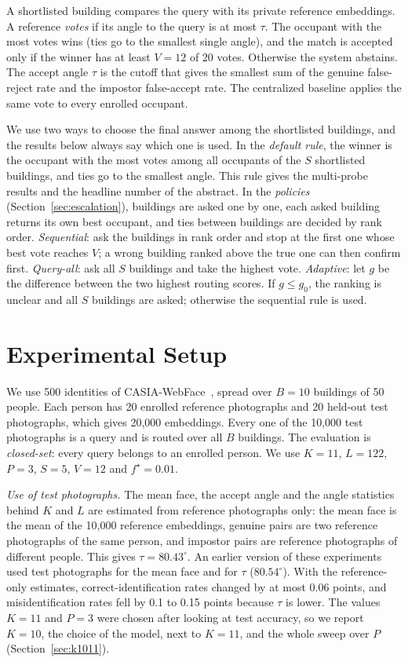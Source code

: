 \documentclass[runningheads]{llncs}
\begin{document}
A shortlisted building compares the query with its private reference embeddings. A reference \emph{votes} if its
angle to the query is at most $\tau$. The occupant with the most votes wins (ties go to the smallest single angle),
and the match is accepted only if the winner has at least $V=12$ of 20 votes. Otherwise the system abstains. The
accept angle $\tau$ is the cutoff that gives the smallest sum of the genuine false-reject rate and the impostor
false-accept rate. The centralized baseline applies the same vote to every enrolled occupant.

We use two ways to choose the final answer among the shortlisted buildings, and the results below always say which
one is used. In the \emph{default rule}, the winner is the occupant with the most votes among all occupants of the
$S$ shortlisted buildings, and ties go to the smallest angle. This rule gives the multi-probe results and the
headline number of the abstract. In the \emph{policies} (Section~\ref{sec:escalation}), buildings are asked one by
one, each asked building returns its own best occupant, and ties between buildings are decided by rank order.
\emph{Sequential}: ask the buildings in rank order and stop at the first one whose best vote reaches $V$; a wrong
building ranked above the true one can then confirm first. \emph{Query-all}: ask all $S$ buildings and take the
highest vote. \emph{Adaptive}: let $g$ be the difference between the two highest routing scores. If $g\le g_0$, the
ranking is unclear and all $S$ buildings are asked; otherwise the sequential rule is used.
\label{sec:escalation}

\section{Experimental Setup}
\label{sec:setup}

We use 500 identities of CASIA-WebFace~\cite{yi2014}, spread over $B=10$ buildings of 50 people. Each person has 20
enrolled reference photographs and 20 held-out test photographs, which gives 20,000 embeddings. Every one of the
10,000 test photographs is a query and is routed over all $B$ buildings. The evaluation is \emph{closed-set}: every
query belongs to an enrolled person. We use $K=11$, $L=122$, $P=3$, $S=5$, $V=12$ and $f^{\star}=0.01$.

\emph{Use of test photographs.} The mean face, the accept angle and the angle statistics behind $K$ and $L$ are
estimated from reference photographs only: the mean face is the mean of the 10,000 reference embeddings, genuine
pairs are two reference photographs of the same person, and impostor pairs are reference photographs of different
people. This gives $\tau=80.43^{\circ}$. An earlier version of these experiments used test photographs for the mean
face and for $\tau$ ($80.54^{\circ}$). With the reference-only estimates, correct-identification rates changed by at
most 0.06 points, and misidentification rates fell by 0.1 to 0.15 points because $\tau$ is lower. The values $K=11$ and $P=3$ were
chosen after looking at test accuracy, so we report $K=10$, the choice of the model, next to $K=11$, and the whole
sweep over $P$ (Section~\ref{sec:k1011}).
\end{document}
